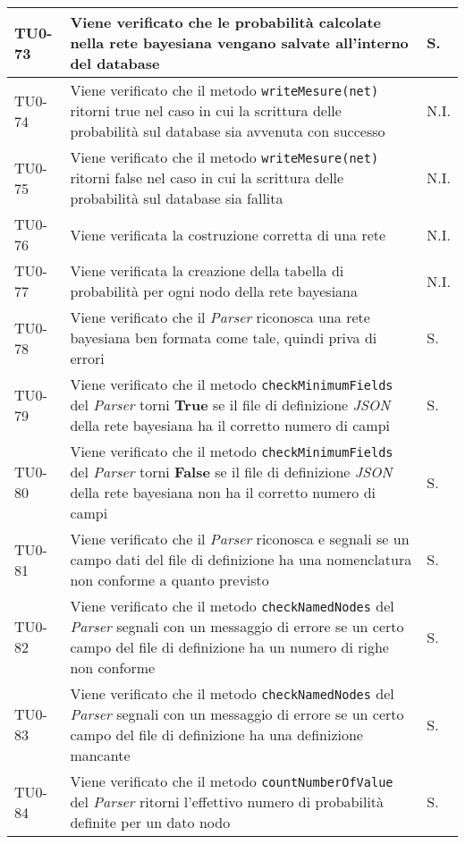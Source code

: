 \begin{longtable}{|C{.15\textwidth}|m{.66\textwidth}|C{.10\textwidth}|}
\hline 
{} TU0-73 & Viene verificato che le probabilità calcolate nella rete bayesiana vengano salvate all'interno del database  & S. \\ 
\hline 
TU0-74 & Viene verificato che il metodo \texttt{writeMesure(net)}  ritorni true nel caso in cui la scrittura delle probabilità sul database sia avvenuta con successo & N.I. \\
\hline
{}TU0-75 & Viene verificato che il metodo \texttt{writeMesure(net)} ritorni false nel caso in cui la scrittura delle probabilità sul database sia fallita & N.I. \\ 
\hline
TU0-76 & Viene verificata la costruzione corretta di una rete & N.I.  \\ 
\hline 
{}TU0-77 & Viene verificata la creazione della tabella di probabilità per ogni nodo della rete bayesiana & N.I. \\ 
\hline
TU0-78 & Viene verificato che il \textit{Parser} riconosca una rete bayesiana ben formata come tale, quindi priva di errori & S. \\
\hline
{}TU0-79 & Viene verificato che il metodo \texttt{checkMinimumFields} del \textit{Parser} torni \textbf{True} se il file di definizione \textit{JSON} della rete bayesiana ha il corretto numero di campi & S.\\
\hline
TU0-80 & Viene verificato che il metodo \texttt{checkMinimumFields} del \textit{Parser} torni \textbf{False} se il file di definizione \textit{JSON} della rete bayesiana non ha il corretto numero di campi & S.\\
\hline
{}TU0-81 & Viene verificato che il \textit{Parser} riconosca e segnali se un campo dati del file di definizione ha una nomenclatura non conforme a quanto previsto & S.\\
\hline
TU0-82 & Viene verificato che il metodo \texttt{checkNamedNodes} del \textit{Parser} segnali con un messaggio di errore se un certo campo del file di definizione ha un numero di righe non conforme & S.\\
\hline
{}TU0-83 & Viene verificato che il metodo \texttt{checkNamedNodes} del \textit{Parser} segnali con un messaggio di errore se un certo campo del file di definizione ha una definizione mancante & S.\\
\hline
TU0-84 & Viene verificato che il metodo \texttt{countNumberOfValue} del \textit{Parser} ritorni l'effettivo numero di probabilità definite per un dato nodo & S.\\

\end{longtable}
